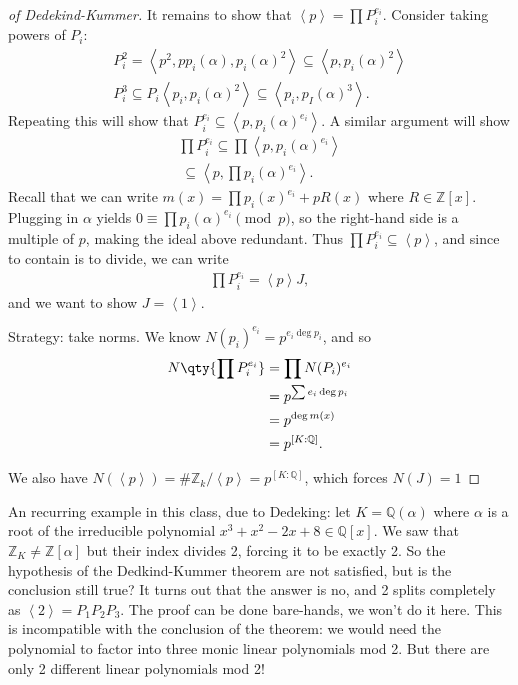 \begin{proof}[of Dedekind-Kummer]
It remains to show that
\(\left\langle{ p }\right\rangle= \prod P_i^{e_i}\). Consider taking
powers of \(P_i\):
\begin{align*}
P_i^2 = \left\langle{ p^2, p p_i( \alpha), p_i(\alpha)^2 }\right\rangle 
\subseteq \left\langle{ p, p_i( \alpha) ^2 }\right\rangle  \\
P_i^3 \subseteq P_i \left\langle{ p_i, p_i (\alpha)^2}\right\rangle \subseteq \left\langle{ p_i, p_I( \alpha)^3 }\right\rangle  
.\end{align*}
Repeating this will show that
\(P_i^{e_i} \subseteq \left\langle{ p, p_i( \alpha)^{e_i} }\right\rangle\).
A similar argument will show
\begin{align*}
\prod P_i^{e_i}
\subseteq 
\prod \left\langle{ p, p_i( \alpha)^{e_i}  }\right\rangle \\\
\subseteq \left\langle{ p, \prod p_i (\alpha) ^{e_i} }\right\rangle 
.\end{align*}
Recall that we can write \(m(x) = \prod p_i(x)^{e_i} + pR(x)\) where
\(R \in {\mathbb{Z}}[x]\). Plugging in \(\alpha\) yields
\(0 \equiv \prod p_i( \alpha)^{e_i} \pmod p\), so the right-hand side is
a multiple of \(p\), making the ideal above redundant. Thus
\(\prod P_i^{e_i} \subseteq \left\langle{ p }\right\rangle\), and since
to contain is to divide, we can write
\begin{align*}
\prod P_i^{e_i} = \left\langle{ p }\right\rangle J
,\end{align*}
and we want to show \(J = \left\langle{ 1 }\right\rangle\).

Strategy: take norms. We know \(N(p_i)^{e_i} = p^{e_i \deg p_i}\), and
so
\begin{align*}
N\qty{ \prod P_i^{e_i} }
&= \prod N(P_i) ^{e_i} \\
&= p^{\sum e_i \deg p_i} \\
&= p^{\deg m(x)} \\
&= p^{[K: {\mathbb{Q}}] }
.\end{align*}

We also have
\(N( \left\langle{ p }\right\rangle ) = \# {\mathbb{Z}}_k / \left\langle{ p }\right\rangle= p^{[K: {\mathbb{Q}}]}\),
which forces \(N(J) = 1\)

\end{proof}

\begin{remark}

An recurring example in this class, due to Dedeking: let
\(K = {\mathbb{Q}}( \alpha)\) where \(\alpha\) is a root of the
irreducible polynomial \(x^3 +x^2 -2x + 8 \in {\mathbb{Q}}[x]\). We saw
that \({\mathbb{Z}}_K \neq {\mathbb{Z}}[ \alpha]\) but their index
divides 2, forcing it to be exactly 2. So the hypothesis of the
Dedkind-Kummer theorem are not satisfied, but is the conclusion still
true? It turns out that the answer is no, and 2 splits completely as
\(\left\langle{ 2 }\right\rangle = P_1 P_2 P_3\). The proof can be done
bare-hands, we won't do it here. This is incompatible with the
conclusion of the theorem: we would need the polynomial to factor into
three monic linear polynomials mod 2. But there are only 2 different
linear polynomials mod 2!

\end{remark}

